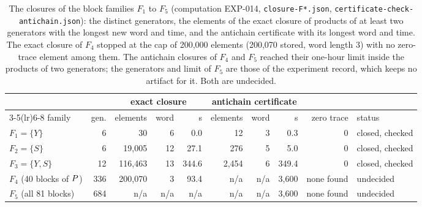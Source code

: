\begin{table}[t]\centering\footnotesize
\setlength{\tabcolsep}{3.5pt}
\begin{tabular}{lrrrrrrrrl}
\toprule
 & & \multicolumn{3}{c}{exact closure} & \multicolumn{3}{c}{antichain certificate} & & \\
\cmidrule(lr){3-5}\cmidrule(lr){6-8}
family & gen. & elements & word & s & elements & word & s & zero trace & status \\
\midrule
$F_1 = \{Y\}$ & 6 & 30 & 6 & 0.0 & 12 & 3 & 0.3 & 0 & closed, checked \\
$F_2 = \{S\}$ & 6 & 19{,}005 & 12 & 27.1 & 276 & 5 & 5.0 & 0 & closed, checked \\
$F_3 = \{Y, S\}$ & 12 & 116{,}463 & 13 & 344.6 & 2{,}454 & 6 & 349.4 & 0 & closed, checked \\
$F_4$ (40 blocks of $P$) & 336 & 200{,}070 & 3 & 93.4 & n/a & n/a & 3{,}600 & none found & undecided \\
$F_5$ (all 81 blocks) & 684 & n/a & n/a & n/a & n/a & n/a & 3{,}600 & none found & undecided \\
\bottomrule
\end{tabular}
\caption{The closures of the block families $F_1$ to $F_5$ (computation EXP-014, \texttt{closure-F*.json}, \texttt{certificate-check-antichain.json}): the distinct generators, the elements of the exact closure of products of at least two generators with the longest new word and time, and the antichain certificate with its longest word and time. The exact closure of $F_4$ stopped at the cap of 200{,}000 elements (200{,}070 stored, word length 3) with no zero-trace element among them. The antichain closures of $F_4$ and $F_5$ reached their one-hour limit inside the products of two generators; the generators and limit of $F_5$ are those of the experiment record, which keeps no artifact for it. Both are undecided.}\label{tab:closures}
\end{table}
